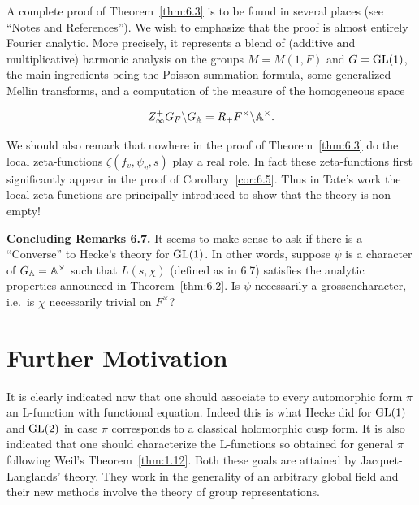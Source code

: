 \begin{remark}\label{rem:6.6}

A complete proof of Theorem~\ref{thm:6.3} is to be found in several places (see ``Notes and References''). We wish to emphasize that the proof is almost entirely Fourier analytic. More precisely, it represents a blend of (additive and multiplicative) harmonic analysis on the groups $M = M(1, F)$ and $G = \operatorname{GL}(1)$, the main ingredients being the Poisson summation formula, some generalized Mellin transforms, and a computation of the measure of the homogeneous space

\[
Z_{\infty}^{+} G_F \backslash G_{\mathbb{A}} = R_{+} F^{\times} \backslash \mathbb{A}^{\times}.
\]

We should also remark that nowhere in the proof of Theorem~\ref{thm:6.3} do the local zeta-functions $\zeta(f_v, \psi_v, s)$ play a real role. In fact these zeta-functions first significantly appear in the proof of Corollary~\ref{cor:6.5}. Thus in Tate's work the local zeta-functions are principally introduced to show that the theory is non-empty!

\end{remark}

\textbf{Concluding Remarks 6.7.} It seems to make sense to ask if there is a ``Converse'' to Hecke's theory for $\operatorname{GL}(1)$. In other words, suppose $\psi$ is a character of $G_{\mathbb{A}} = \mathbb{A}^{\times}$ such that $L(s, \chi)$ (defined as in 6.7) satisfies the analytic properties announced in Theorem~\ref{thm:6.2}. Is $\psi$ necessarily a grossencharacter, i.e.\ is $\chi$ necessarily trivial on $F^{\times}$?

\addtocounter{theorem}{1}

\section{Further Motivation}\label{sec:6b}

It is clearly indicated now that one should associate to every automorphic form $\pi$ an L-function with functional equation. Indeed this is what Hecke did for $\operatorname{GL}(1)$ and $\operatorname{GL}(2)$ in case $\pi$ corresponds to a classical holomorphic cusp form. It is also indicated that one should characterize the L-functions so obtained for general $\pi$ following Weil's Theorem~\ref{thm:1.12}. Both these goals are attained by Jacquet-Langlands' theory. They work in the generality of an arbitrary global field and their new methods involve the theory of group representations.

